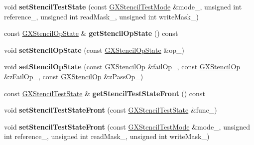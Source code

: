 \begin{DoxyCompactItemize}
\item 
void {\bfseries set\+Stencil\+Test\+State} (const \hyperlink{class_magnum_1_1_g_x_stencil_test_mode}{G\+X\+Stencil\+Test\+Mode} \&mode\+\_\+, unsigned int reference\+\_\+, unsigned int read\+Mask\+\_\+, unsigned int write\+Mask\+\_\+)\hypertarget{class_magnum_1_1_g_x_context_a51ddac53d744f328ecae61f0d3586b70}{}\label{class_magnum_1_1_g_x_context_a51ddac53d744f328ecae61f0d3586b70}

\item 
const \hyperlink{class_magnum_1_1_g_x_stencil_op_state}{G\+X\+Stencil\+Op\+State} \& {\bfseries get\+Stencil\+Op\+State} () const \hypertarget{class_magnum_1_1_g_x_context_aa2d848fa986ee4cdf03249b482a040a2}{}\label{class_magnum_1_1_g_x_context_aa2d848fa986ee4cdf03249b482a040a2}

\item 
void {\bfseries set\+Stencil\+Op\+State} (const \hyperlink{class_magnum_1_1_g_x_stencil_op_state}{G\+X\+Stencil\+Op\+State} \&op\+\_\+)\hypertarget{class_magnum_1_1_g_x_context_a401a7210f55a636d228df72b2eeef171}{}\label{class_magnum_1_1_g_x_context_a401a7210f55a636d228df72b2eeef171}

\item 
void {\bfseries set\+Stencil\+Op\+State} (const \hyperlink{class_magnum_1_1_g_x_stencil_op}{G\+X\+Stencil\+Op} \&fail\+Op\+\_\+, const \hyperlink{class_magnum_1_1_g_x_stencil_op}{G\+X\+Stencil\+Op} \&z\+Fail\+Op\+\_\+, const \hyperlink{class_magnum_1_1_g_x_stencil_op}{G\+X\+Stencil\+Op} \&z\+Pass\+Op\+\_\+)\hypertarget{class_magnum_1_1_g_x_context_a51c51855b627d2c2f0a48170cee85376}{}\label{class_magnum_1_1_g_x_context_a51c51855b627d2c2f0a48170cee85376}

\item 
const \hyperlink{class_magnum_1_1_g_x_stencil_test_state}{G\+X\+Stencil\+Test\+State} \& {\bfseries get\+Stencil\+Test\+State\+Front} () const \hypertarget{class_magnum_1_1_g_x_context_ae691ff5bc7eadf1c63b231a91e5d3771}{}\label{class_magnum_1_1_g_x_context_ae691ff5bc7eadf1c63b231a91e5d3771}

\item 
void {\bfseries set\+Stencil\+Test\+State\+Front} (const \hyperlink{class_magnum_1_1_g_x_stencil_test_state}{G\+X\+Stencil\+Test\+State} \&func\+\_\+)\hypertarget{class_magnum_1_1_g_x_context_ac6d35490a2f6d46107a5cacc1c182616}{}\label{class_magnum_1_1_g_x_context_ac6d35490a2f6d46107a5cacc1c182616}

\item 
void {\bfseries set\+Stencil\+Test\+State\+Front} (const \hyperlink{class_magnum_1_1_g_x_stencil_test_mode}{G\+X\+Stencil\+Test\+Mode} \&mode\+\_\+, unsigned int reference\+\_\+, unsigned int read\+Mask\+\_\+, unsigned int write\+Mask\+\_\+)\hypertarget{class_magnum_1_1_g_x_context_a3affefbf98251f390ae99e9cb68ce6e6}{}\label{class_magnum_1_1_g_x_context_a3affefbf98251f390ae99e9cb68ce6e6}


\end{DoxyCompactItemize}
